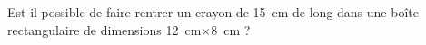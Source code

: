 
\begin{exercice}\label{exo2smath-0018}

    Est-il possible de faire rentrer un crayon de \SI{15}{\centi\meter} de long dans une boîte rectangulaire de dimensions \SI{12}{\centi\meter}\( \times\)\SI{8}{\centi\meter} ?

\end{exercice}
